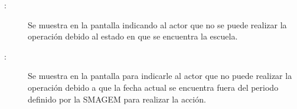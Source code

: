     \begin{description}
	\item[:] Se muestra en la pantalla  indicando al actor que no se puede realizar la operación debido al estado en que se encuentra la escuela.
	
	\item [:] Se muestra en la pantalla  para indicarle al actor que no puede realizar la operación debido a que la fecha actual se encuentra fuera del periodo definido por la SMAGEM para realizar la acción.
    \end{description}
